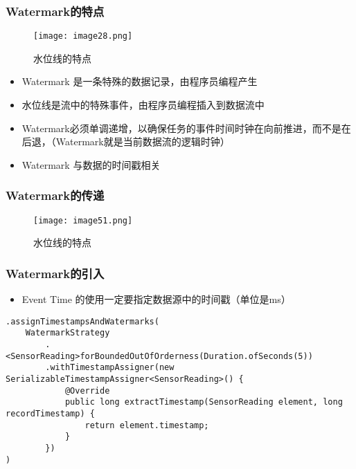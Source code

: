 \documentclass{beamer}
\begin{document}
  \begin{frame}
      \frametitle{Watermark的特点}

      \begin{figure}
        \centering
        \texttt{[image: image28.png]}
        \caption{水位线的特点}
      \end{figure}
  
      \begin{itemize}
          \item Watermark 是一条特殊的数据记录，由程序员编程产生
          \item 水位线是流中的特殊事件，由程序员编程插入到数据流中
          \item Watermark必须单调递增，以确保任务的事件时间时钟在向前推进，而不是在后退，（Watermark就是当前数据流的逻辑时钟）
          \item Watermark 与数据的时间戳相关
      \end{itemize}
  
  \end{frame}

  \begin{frame}
      \frametitle{Watermark的传递}

      \begin{figure}
        \centering
        \texttt{[image: image51.png]}
        \caption{水位线的特点}
      \end{figure}
  
  \end{frame}

  \begin{frame}[fragile]
      \frametitle{Watermark的引入}

      \begin{itemize}
          \item Event Time 的使用一定要指定数据源中的时间戳（单位是ms）
      \end{itemize}

\begin{verbatim}
.assignTimestampsAndWatermarks(
    WatermarkStrategy
        .<SensorReading>forBoundedOutOfOrderness(Duration.ofSeconds(5))
        .withTimestampAssigner(new SerializableTimestampAssigner<SensorReading>() {
            @Override
            public long extractTimestamp(SensorReading element, long recordTimestamp) {
                return element.timestamp;
            }
        })
)
\end{verbatim}
  
  \end{frame}
\end{document}
